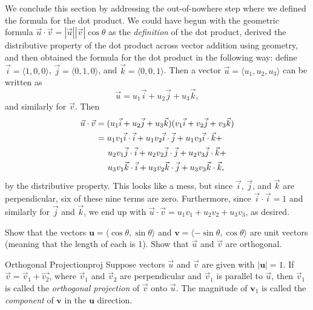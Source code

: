 \documentclass[indent]{watsonbook}
\begin{document}
{We conclude this section by addressing the out-of-nowhere step where
we defined the formula for the dot product. We could have begun with
the geometric formula
$\vec{u} \cdot \vec{v} = |\vec{u}| |\vec{v}| \cos\theta$ as the
\textit{definition} of the dot product, derived the distributive
property of the dot product across vector addition using geometry, and
then obtained the formula for the dot product in the following
way: define $\vec{i} = \langle1,0,0\rangle$,
$\vec{j} = \langle0,1,0\rangle$, and $\vec{k} =
\langle0,0,1\rangle$. Then a vector
$\vec{u} = \langle u_1, u_2, u_3\rangle$ can be written as
\[
  \vec{u} = u_1 \vec{i} + u_2 \vec{j} + u_3 \vec{k},
\]
and similarly for $\vec{v}$. Then
\begin{align*}
  \vec{u} \cdot \vec{v} &= (u_1 \vec{i} + u_2 \vec{j} + u_3
                          \vec{k})(v_1 \vec{i} + v_2 \vec{j} + v_3 \vec{k})  \\
                        &= u_1 v_1 \vec{i} \cdot \vec{i} + u_1 v_2 \vec{i} \cdot
                          \vec{j}  + u_1 v_3 \vec{i} \cdot \vec{k}  + \\
                        &\hspace{5mm}  u_2 v_1 \vec{j} \cdot \vec{i} + u_2 v_2 \vec{j} \cdot
                          \vec{j}  + u_2 v_3 \vec{j} \cdot \vec{k}  + \\
                        &\hspace{5mm}  u_3 v_1 \vec{k} \cdot \vec{i} + u_3 v_2 \vec{k} \cdot
                          \vec{j}  + u_3 v_3 \vec{k} \cdot \vec{k},
\end{align*}
by the distributive property. This looks like a mess, but since
$\vec{i}$,  $\vec{j}$, and  $\vec{k}$ are
perpendicular, six of these nine terms are zero. Furthermore, since
$\vec{i}\cdot \vec{i} = 1$ and similarly for $\vec{j}$ and
$\vec{k}$, we end up with $  \vec{u} \cdot \vec{v}  = u_1 v_1
+ u_2 v_2 + u_3 v_3$, as desired.

\begin{exercise}{}{}
  Show that the vectors
  $\mathbf{u} = \langle \cos \theta, \sin \theta \rangle$ and
  $\mathbf{v} = \langle -\sin \theta, \cos \theta \rangle$ are unit
  vectors (meaning that the length of each is 1). Show that $\vec{u}$
  and $\vec{v}$ are orthogonal.
\end{exercise}

\begin{exercise}{Orthogonal Projection}{proj}
  Suppose vectors $\vec{u}$ and $\vec{v}$ are given with
  $|\mathbf{u}| = 1$. If $\vec{v} = \vec{v}_1 + \vec{v_2}$, where
  $\vec{v}_1$ and $\vec{v}_2$ are perpendicular and $\vec{v}_1$ is
  parallel to $\vec{u}$, then $\vec{v}_1$ is called the
  \textit{orthogonal projection} of $\vec{v}$ onto $\vec{u}$. The
  magnitude of $\mathbf{v}_1$ is called the \textit{component} of
  $\mathbf{v}$ in the $\mathbf{u}$ direction.


\end{exercise}}
\end{document}
